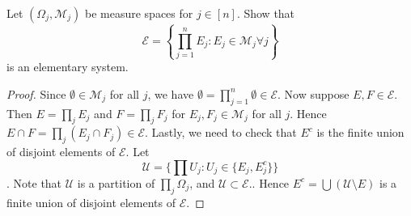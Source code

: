 \documentclass{article}
\begin{document}
 Let $(\Omega_j , \mathcal M_j)$ be measure spaces for $j \in [n]$. Show that 
$$ \mathcal E = \left\{ \prod_{j=1}^n E_j : E_j \in \mathcal M_j \forall j \right\} $$
is an elementary system.

\begin{proof}
Since $\emptyset \in \mathcal M_j$ for all $j$, we have $\emptyset = \prod_{j=1}^n \emptyset \in \mathcal E$. Now suppose $E, F \in \mathcal E$. Then $E = \prod_j E_j$ and $F = \prod_j F_j$ for $E_j, F_j \in \mathcal M_j$ for all $j$. Hence $E \cap F = \prod_j (E_j \cap F_j) \in \mathcal E$.  Lastly, we need to check that $E^c$ is the finite union of disjoint elements of $\mathcal E$. Let 
$$\mathcal U = \{\prod U_j : U_j \in \{E_j, E_j^c \} \}$$.
Note that $\mathcal U$ is a partition of $\prod_j \Omega_j$, and $\mathcal U \subset \mathcal E$..  Hence $E^c = \bigcup (\mathcal U \setminus {E})$ is a finite union of disjoint elements of $\mathcal E$.
\end{proof}
\end{document}
